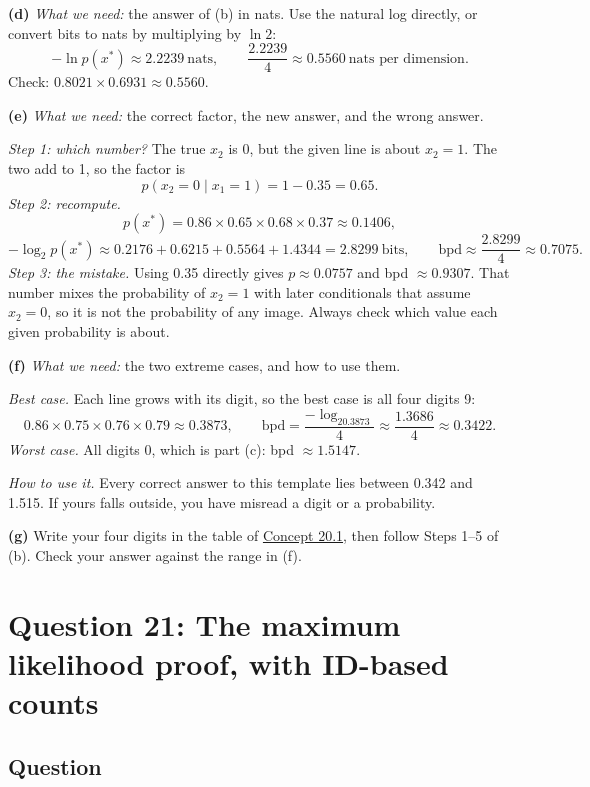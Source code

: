 \documentclass[12pt,a4paper]{article}
\begin{document}
\textbf{(d)} \emph{What we need:} the answer of (b) in nats. Use the natural log directly, or convert bits to nats by multiplying by $\ln2$:
\[
-\ln p(x^*)\approx2.2239\ \text{nats},\qquad \frac{2.2239}{4}\approx0.5560\ \text{nats per dimension}.
\]
Check: $0.8021\times0.6931\approx0.5560$.

\textbf{(e)} \emph{What we need:} the correct factor, the new answer, and the wrong answer.

\emph{Step 1: which number?} The true $x_2$ is 0, but the given line is about $x_2=1$. The two add to 1, so the factor is
\[
p(x_2=0\mid x_1=1)=1-0.35=0.65 .
\]
\emph{Step 2: recompute.}
\[
p(x^*)=0.86\times0.65\times0.68\times0.37\approx0.1406,
\]
\[
-\log_2p(x^*)\approx0.2176+0.6215+0.5564+1.4344=2.8299\ \text{bits},\qquad \text{bpd}\approx\frac{2.8299}{4}\approx0.7075 .
\]
\emph{Step 3: the mistake.} Using 0.35 directly gives $p\approx0.0757$ and bpd $\approx0.9307$. That number mixes the probability of $x_2=1$ with later conditionals that assume $x_2=0$, so it is not the probability of any image. Always check which value each given probability is about.

\textbf{(f)} \emph{What we need:} the two extreme cases, and how to use them.

\emph{Best case.} Each line grows with its digit, so the best case is all four digits 9:
\[
0.86\times0.75\times0.76\times0.79\approx0.3873,\qquad \text{bpd}=\frac{-\log_20.3873}{4}\approx\frac{1.3686}{4}\approx0.3422 .
\]
\emph{Worst case.} All digits 0, which is part (c): bpd $\approx1.5147$.

\emph{How to use it.} Every correct answer to this template lies between 0.342 and 1.515. If yours falls outside, you have misread a digit or a probability.

\textbf{(g)} Write your four digits in the table of \hyperref[c20-1]{Concept 20.1}, then follow Steps 1--5 of (b). Check your answer against the range in (f).
\newpage
\section{Question 21: The maximum likelihood proof, with ID-based counts}

\subsection{Question}
\end{document}
